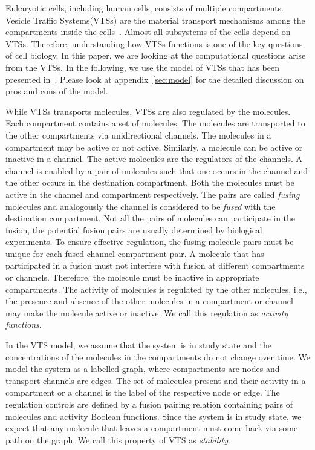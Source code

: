 Eukaryotic cells, including human cells, consists of multiple compartments.
%
Vesicle Traffic Systems(VTSs) are the material transport mechanisms
among the compartments inside the cells~\cite{vtsIntro}.
%
Almost all subsystems of the cells depend on VTSs.
%
Therefore, understanding how VTSs functions is one of the key
questions of cell biology.
%
In this paper, we are looking at the computational questions 
arise from the VTSs.
%
In the following, we use the model of VTSs that has been presented
in~\cite{VTS}.
%
Please look at appendix~\ref{sec:model}
for the detailed discussion on pros and cons of the model.

While VTSs transports molecules, VTSs are also
regulated by the molecules.
%
Each compartment contains a set of molecules.
%
The molecules are transported to the other compartments via
unidirectional channels.  
%
The molecules in a compartment may be active or not active.
%
Similarly, a molecule can be active or inactive in a channel. 
%
The active molecules are the regulators of the channels.
%
A channel is enabled by a pair of molecules
such that one occurs in the channel and the other
occurs in the destination compartment.
%
Both the molecules must be active in the channel
and compartment respectively.
%
The pairs are called {\em fusing} molecules and analogously
the channel is considered to be {\em fused} with the
destination compartment.
%
Not all the pairs of molecules can participate in the fusion, the
potential fusion pairs are usually determined by biological experiments.
%
To ensure effective regulation, the fusing molecule pairs must be
unique for each fused channel-compartment pair.
%
A molecule that has participated in a fusion must not interfere
with fusion at different compartments or channels.
%
Therefore, the molecule must be inactive in appropriate compartments.
%
The activity of molecules is regulated by the other molecules, i.e.,
the presence and absence of the other molecules in a compartment or
channel may make the molecule active or inactive.
%
We call this regulation as {\em activity functions}.

%
In the VTS model, we assume that the system is in study state and
the concentrations of the molecules in the compartments do not change over time.
%
We model the system as a labelled graph, where compartments are nodes and
transport channels are edges.
%
The set of molecules present and their activity in a compartment or
a channel is the label of the respective node or edge.
%
The regulation controls are defined by a fusion pairing relation
containing pairs of molecules and activity
Boolean functions.
%
Since the system is in study state, we expect that any molecule that
leaves a compartment must come back via some path on the graph.
%
We call this property of VTS as {\em stability}.


